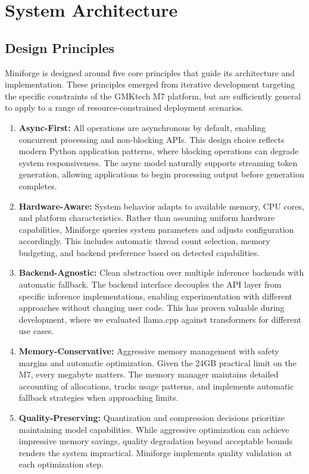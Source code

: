 \section{System Architecture}
\label{sec:architecture}

\subsection{Design Principles}

Miniforge is designed around five core principles that guide its architecture and implementation. These principles emerged from iterative development targeting the specific constraints of the GMKtech M7 platform, but are sufficiently general to apply to a range of resource-constrained deployment scenarios.

\begin{enumerate}
    \item \textbf{Async-First:} All operations are asynchronous by default, enabling concurrent processing and non-blocking APIs. This design choice reflects modern Python application patterns, where blocking operations can degrade system responsiveness. The async model naturally supports streaming token generation, allowing applications to begin processing output before generation completes.
    
    \item \textbf{Hardware-Aware:} System behavior adapts to available memory, CPU cores, and platform characteristics. Rather than assuming uniform hardware capabilities, Miniforge queries system parameters and adjusts configuration accordingly. This includes automatic thread count selection, memory budgeting, and backend preference based on detected capabilities.
    
    \item \textbf{Backend-Agnostic:} Clean abstraction over multiple inference backends with automatic fallback. The backend interface decouples the API layer from specific inference implementations, enabling experimentation with different approaches without changing user code. This has proven valuable during development, where we evaluated llama.cpp against transformers for different use cases.
    
    \item \textbf{Memory-Conservative:} Aggressive memory management with safety margins and automatic optimization. Given the 24GB practical limit on the M7, every megabyte matters. The memory manager maintains detailed accounting of allocations, tracks usage patterns, and implements automatic fallback strategies when approaching limits.
    
    \item \textbf{Quality-Preserving:} Quantization and compression decisions prioritize maintaining model capabilities. While aggressive optimization can achieve impressive memory savings, quality degradation beyond acceptable bounds renders the system impractical. Miniforge implements quality validation at each optimization step.
\end{enumerate}

